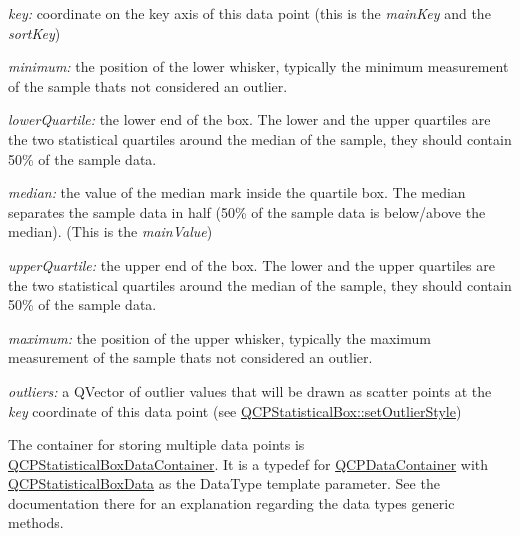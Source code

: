 \begin{DoxyItemize}
\item {\itshape key\+:} coordinate on the key axis of this data point (this is the {\itshape main\+Key} and the {\itshape sort\+Key})\end{DoxyItemize}
\begin{DoxyItemize}
\item {\itshape minimum\+:} the position of the lower whisker, typically the minimum measurement of the sample that\textquotesingle{}s not considered an outlier.\end{DoxyItemize}
\begin{DoxyItemize}
\item {\itshape lower\+Quartile\+:} the lower end of the box. The lower and the upper quartiles are the two statistical quartiles around the median of the sample, they should contain 50\% of the sample data.\end{DoxyItemize}
\begin{DoxyItemize}
\item {\itshape median\+:} the value of the median mark inside the quartile box. The median separates the sample data in half (50\% of the sample data is below/above the median). (This is the {\itshape main\+Value})\end{DoxyItemize}
\begin{DoxyItemize}
\item {\itshape upper\+Quartile\+:} the upper end of the box. The lower and the upper quartiles are the two statistical quartiles around the median of the sample, they should contain 50\% of the sample data.\end{DoxyItemize}
\begin{DoxyItemize}
\item {\itshape maximum\+:} the position of the upper whisker, typically the maximum measurement of the sample that\textquotesingle{}s not considered an outlier.\end{DoxyItemize}
\begin{DoxyItemize}
\item {\itshape outliers\+:} a Q\+Vector of outlier values that will be drawn as scatter points at the {\itshape key} coordinate of this data point (see \hyperlink{class_q_c_p_statistical_box_ad5241943422eb8e58360a97e99ad6aa7}{Q\+C\+P\+Statistical\+Box\+::set\+Outlier\+Style})\end{DoxyItemize}
The container for storing multiple data points is \hyperlink{qcustomplot_8hh_a8b773c0c35f8f924701ced6e9915e4c7}{Q\+C\+P\+Statistical\+Box\+Data\+Container}. It is a typedef for \hyperlink{class_q_c_p_data_container}{Q\+C\+P\+Data\+Container} with \hyperlink{class_q_c_p_statistical_box_data}{Q\+C\+P\+Statistical\+Box\+Data} as the Data\+Type template parameter. See the documentation there for an explanation regarding the data type\textquotesingle{}s generic methods.

